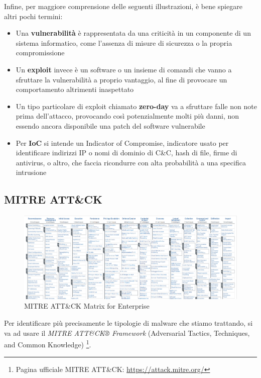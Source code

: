 Infine, per maggiore comprensione delle seguenti illustrazioni, è bene spiegare altri pochi termini:
\begin{itemize}
    \item Una \textbf{vulnerabilità} è rappresentata da una criticità in un componente di un sistema informatico, come l'assenza di misure di sicurezza o la propria compromissione
    \item Un \textbf{exploit} invece è un software o un insieme di comandi che vanno a sfruttare la vulnerabilità a proprio vantaggio, al fine di provocare un comportamento altrimenti inaspettato
    \item Un tipo particolare di exploit chiamato \textbf{zero-day} va a sfruttare falle non note prima dell'attacco, provocando così potenzialmente molti più danni, non essendo ancora disponibile una patch del software vulnerabile
    \item Per \textbf{IoC} si intende un Indicator of Compromise, indicatore usato per identificare indirizzi IP o nomi di dominio di C\&C, hash di file, firme di antivirus, o altro, che faccia ricondurre con alta probabilità a una specifica intrusione
\end{itemize}

\subsection{MITRE ATT\&CK}
\label{chap:mitre_attack}

\begin{figure}[htbp]
    \centering
    \includegraphics[width=\textwidth]{assets/mitre_attack_matrix.png}
    \caption{MITRE ATT\&CK Matrix for Enterprise}
    \label{fig:mitre_attack_matrix}
\end{figure}

Per identificare più precisamente le tipologie di malware che stiamo trattando, si va ad usare il \emph{MITRE ATT\&CK® Framework} (Adversarial Tactics, Techniques, and Common Knowledge)
\footnote{Pagina ufficiale MITRE ATT\&CK: \url{https://attack.mitre.org/}}.

